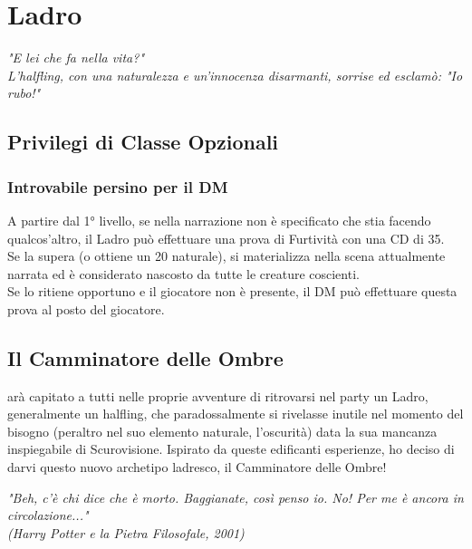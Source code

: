 \chapter{Ladro}

\begin{DndReadAloud}
  \it
  "E lei che fa nella vita?" \\ L'halfling, con una naturalezza e un'innocenza disarmanti, sorrise ed esclamò: "Io rubo!"
\end{DndReadAloud}

\section{Privilegi di Classe Opzionali}

\subsection{Introvabile persino per il DM}

A partire dal 1° livello, se nella narrazione non è specificato che stia facendo qualcos'altro, il Ladro può effettuare una prova di Furtività con una CD di 35. \\ Se la supera (o ottiene un 20 naturale), si materializza nella scena attualmente narrata ed è considerato nascosto da tutte le creature coscienti. \\ Se lo ritiene opportuno e il giocatore non è presente, il DM può effettuare questa prova al posto del giocatore.

\section{Il Camminatore delle Ombre}

arà capitato a tutti nelle proprie avventure di ritrovarsi nel party un Ladro, generalmente un halfling, che paradossalmente si rivelasse inutile nel momento del bisogno (peraltro nel suo elemento naturale, l'oscurità) data la sua mancanza inspiegabile di Scurovisione. Ispirato da queste edificanti esperienze, ho deciso di darvi questo nuovo archetipo ladresco, il Camminatore delle Ombre!

\begin{DndReadAloud}
  \it
  "Beh, c'è chi dice che è morto. Baggianate, così penso io. No! Per me è ancora in circolazione..." \\ (Harry Potter e la Pietra Filosofale, 2001)
\end{DndReadAloud}

